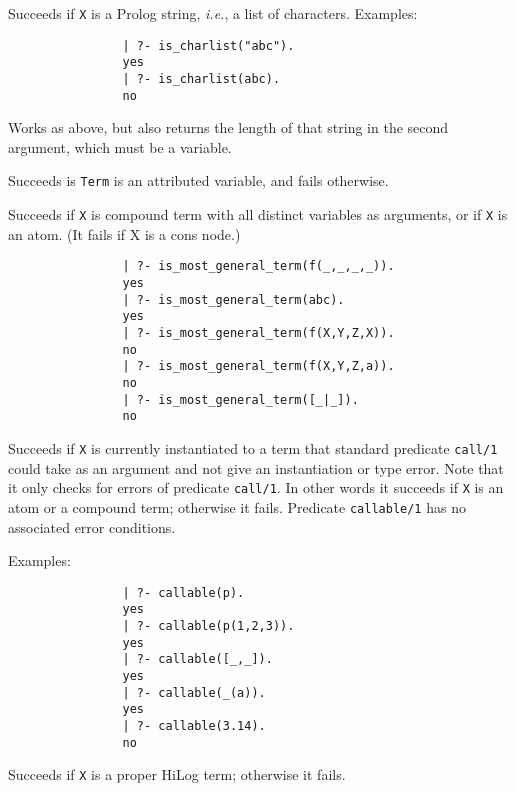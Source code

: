 \begin{description}
    Succeeds if {\tt X} is a Prolog string, {\it i.e.}, a list of
    characters.
    Examples:
    {\footnotesize
     \begin{verbatim}
                | ?- is_charlist("abc").
                yes
                | ?- is_charlist(abc).
                no
     \end{verbatim}}

    Works as above, but also returns the length of that string in the second
    argument, which must be a variable.

    Succeeds is {\tt Term} is an attributed variable, and fails otherwise.

    Succeeds if {\tt X} is compound term with all distinct variables
as arguments, or if {\tt X} is an atom. (It fails if X is a cons node.)
    {\footnotesize
     \begin{verbatim}
                | ?- is_most_general_term(f(_,_,_,_)).
                yes
                | ?- is_most_general_term(abc).
                yes
                | ?- is_most_general_term(f(X,Y,Z,X)).
                no
                | ?- is_most_general_term(f(X,Y,Z,a)).
                no
                | ?- is_most_general_term([_|_]).
                no
     \end{verbatim}}

    Succeeds if {\tt X} is currently instantiated to a term that standard
    predicate {\tt call/1} could take as an argument and not give an 
    instantiation or type error.  Note that it only checks for errors of
    predicate {\tt call/1}.  In other words it succeeds if {\tt X}
    is an atom or a compound term; otherwise it fails.  Predicate
    {\tt callable/1} has no associated error conditions.

    Examples:
    {\footnotesize
     \begin{verbatim}
                | ?- callable(p).
                yes
                | ?- callable(p(1,2,3)).
                yes
                | ?- callable([_,_]).
                yes
                | ?- callable(_(a)).
                yes
                | ?- callable(3.14).
                no
     \end{verbatim}}

    Succeeds if {\tt X} is a proper HiLog term; otherwise it fails.


\end{description}
